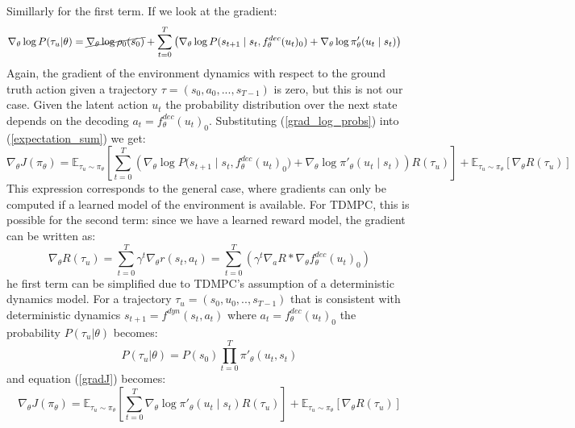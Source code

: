 \documentclass{article}
\begin{document}
Simillarly for the first term. If we look at the gradient:
\begin{equation}\label{grad_log_probs}
\begin{aligned}
\nabla_\theta\log P(\tau_u|\theta)&=\cancel{\nabla_\theta \log \rho_0(s_0)} 
+ \sum_{t=0}^{T} \left( 
{\nabla_\theta \log P(s_{t+1} \mid s_t, f^{dec}_\theta(u_t)_0})
+ \nabla_\theta \log \pi'_\theta(u_t \mid s_t) \right)
\end{aligned}
\end{equation}
Again, the gradient of the environment dynamics with respect to the ground truth action given a trajectory $\tau = (s_0,a_0,...,s_{T-1})$ is zero, but this is not our case. Given the latent action $u_t$ the probability distribution over the next state depends on the decoding $a_t =f^{dec}_\theta(u_t)_0$. Substituting (\ref{grad_log_probs}) into (\ref{expectation_sum}) we get:
\begin{equation}\label{gradJ}
\nabla_\theta J(\pi_\theta)  = \mathbb{E}_{\tau_u\sim\pi_\theta}[\sum_{t=0}^{T} \left( 
{\nabla_\theta \log P(s_{t+1} \mid s_t, f^{dec}_\theta(u_t)_0})
+ \nabla_\theta \log \pi'_\theta(u_t \mid s_t) \right)R(\tau_u)] +\mathbb{E}_{\tau_u\sim\pi_\theta}[\nabla_\theta R(\tau_u)]
\end{equation}
This expression corresponds to the general case, where gradients can only be computed if a learned model of the environment is available. For TDMPC, this is possible for the second term: since we have a learned reward model, the gradient can be written as:
\begin{equation}
\nabla_\theta R(\tau_u) = \sum_{t=0}^T\gamma^t  \nabla_\theta r(s_t,a_t)=  \sum_{t=0}^T(\gamma^t \nabla_a R*\nabla_\theta f^{dec}_\theta(u_t)_0)
\end{equation}
he first term can be simplified due to TDMPC’s assumption of a deterministic dynamics model. For a trajectory $\tau_u=(s_0,u_0,..,s_{T-1})$ that is consistent with deterministic dynamics $s_{t+1}=f^{dyn}(s_t,a_t)$ where $a_t =f^{dec}_\theta(u_t)_0$ the probability $P(\tau_u|\theta)$ becomes: 
\begin{equation}
P(\tau_u|\theta)=P(s_0)\prod_{t=0}^T\pi'_\theta(u_t,s_t)
\end{equation}
and equation (\ref{gradJ}) becomes:
\begin{equation}\label{gradJ}
\nabla_\theta J(\pi_\theta)  = \mathbb{E}_{\tau_u\sim\pi_\theta}[\sum_{t=0}^{T} \nabla_\theta \log \pi'_\theta(u_t \mid s_t) R(\tau_u)] +\mathbb{E}_{\tau_u\sim\pi_\theta}[\nabla_\theta R(\tau_u)]
\end{equation}
\end{document}
